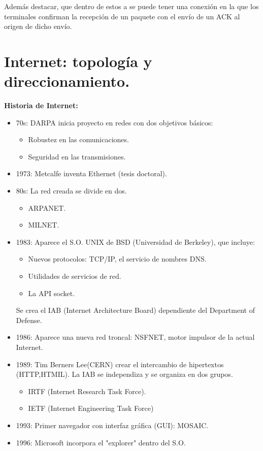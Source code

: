 \documentclass[a4paper,11pt]{article}
\begin{document}
Además destacar, que dentro de estos a se puede tener una conexión en la que los terminales confirman la recepción de un paquete con el envío de un ACK al origen de dicho envío.

\section{Internet: topología y direccionamiento.}
\textbf{Historia de Internet:}
\begin{itemize}
\item 70s: DARPA inicia proyecto en redes con dos objetivos básicos:
	\begin{itemize}
		\item Robustez en las comunicaciones.
		\item Seguridad en las transmisiones.
	\end{itemize}
	
\item 1973: Metcalfe inventa Ethernet (tesis doctoral).
\item 80s: La red creada se divide en dos.
 	\begin{itemize}
 		\item ARPANET.
 		\item MILNET.
 	\end{itemize}
 	
\item 1983: Aparece el S.O. UNIX de BSD (Universidad de Berkeley), que incluye:

	\begin{itemize}
		\item Nuevos protocolos: TCP/IP, el servicio de nombres DNS.
		\item Utilidades de servicios de red.
		\item La API socket.
	\end{itemize}

Se crea el IAB (Internet Architecture Board) dependiente del Department of Defense.

\item 1986: Aparece una nueva red troncal: NSFNET, motor impulsor de la actual Internet.
\item 1989: Tim Berners Lee(CERN) crear el intercambio de hipertextos (HTTP,HTMIL). La IAB se independiza y se organiza en dos grupos.
	
		\begin{itemize}
			\item IRTF (Internet Research Task Force).
			\item IETF (Internet Engineering Task Force)
		\end{itemize}
\item 1993: Primer navegador con interfaz gráfica (GUI): MOSAIC.
\item 1996: Microsoft incorpora el "explorer" dentro del S.O.
\end{itemize}
\end{document}
